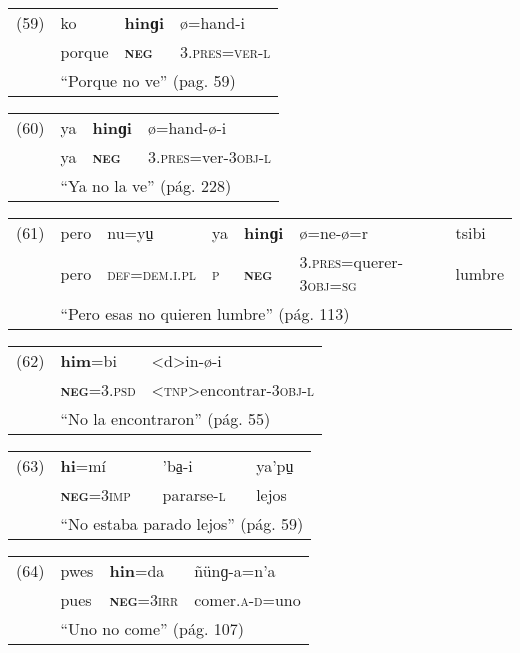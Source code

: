 {\setmainfont{Charis SIL} 

\begin{tabular}{llll}
(59) & ko & \textbf{hinɡi} & ø=hand-i \\
& porque & \textsc{\textbf{neg}} & \textsc{3.pres=ver-l} \\
& \multicolumn{3}{l}{``Porque no ve'' (pag. 59)}
\end{tabular} \vspace{0.3cm}

\begin{tabular}{llll}
(60) & ya & \textbf{hinɡi} & ø=hand-ø-i \\
& ya & \textsc{\textbf{neg}} & \textsc{3.pres}=ver-\textsc{3obj-l} \\
& \multicolumn{3}{l}{``Ya no la ve'' (pág. 228)}
\end{tabular} \vspace{0.3cm}

\begin{tabular}{lllllll}
(61) & pero & nu=yu̠ & ya & \textbf{hinɡi} & ø=ne-ø=r & tsibi \\
& pero & \textsc{def=dem.i.pl} & \textsc{p} & \textsc{\textbf{neg}} & \textsc{3.pres}=querer-\textsc{3obj=sg} & lumbre \\
& \multicolumn{6}{l}{``Pero esas no quieren lumbre'' (pág. 113)}
\end{tabular} \vspace{0.3cm}

\begin{tabular}{lll}
(62) & \textbf{him}=bi & <d>in-ø-i \\
& \textsc{\textbf{neg}=3.psd} & <\textsc{tnp}>encontrar-\textsc{3obj-l} \\
& \multicolumn{2}{l}{``No la encontraron'' (pág. 55)}
\end{tabular} \vspace{0.3cm}

\begin{tabular}{llll}
(63) & \textbf{hi}=mí & 'ba̠-i & ya'pu̠ \\
& \textsc{\textbf{neg}=3imp} & pararse-\textsc{l} & lejos \\
& \multicolumn{3}{l}{``No estaba parado lejos'' (pág. 59)}
\end{tabular} \vspace{0.3cm}

\begin{tabular}{llll}
(64) & pwes & \textbf{hin}=da & ñünɡ-a=n'a \\
& pues & \textsc{\textbf{neg}=3irr} & comer.\textsc{a-d}=uno\\
& \multicolumn{3}{l}{``Uno no come'' (pág. 107)}
\end{tabular} \vspace{0.5cm}

}


